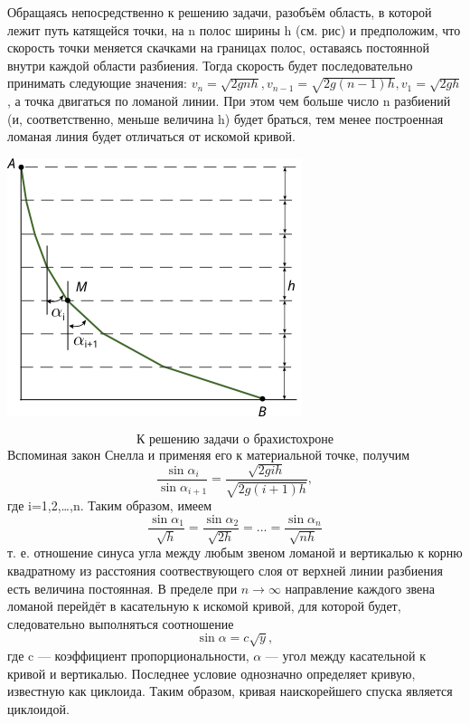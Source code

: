 \documentclass[a4paper, 12pt]{article}
\begin{document}
Обращаясь непосредственно к решению задачи, разобъём область, в которой лежит путь катящейся точки, на n полос ширины h (см. рис) и предположим, что скорость точки меняется скачками на границах полос, оставаясь постоянной внутри каждой области разбиения. Тогда скорость будет последовательно принимать следующие значения: $v_n = \sqrt{2gnh}, v_{n-1} = \sqrt{2g(n-1)h}, v_1 = \sqrt{2gh}$, а точка двигаться по ломаной линии. При этом чем больше число n разбиений (и, соответственно, меньше величина h) будет браться, тем менее построенная ломаная линия будет отличаться от искомой кривой. 
\begin{center}
\includegraphics[scale=1.5]{brahistohrona}
\end{center}
\[\textit{К решению задачи о брахистохроне}\]
Вспоминая закон Снелла и применяя его к материальной точке, получим 
\[\frac{\sin\alpha_i}{\sin\alpha_{i+1}} = \frac{\sqrt{2gih}}{\sqrt{2g(i+1)h}},\]
где i=1,2,…,n. Таким образом, имеем 
\[\frac{\sin\alpha_1}{\sqrt{h}} = \frac{\sin\alpha_2}{\sqrt{2h}} = ... = \frac{\sin\alpha_n}{\sqrt{nh}}\]
т. е. отношение синуса угла между любым звеном ломаной и вертикалью к корню квадратному из расстояния соотвествующего слоя от верхней линии разбиения есть величина постоянная. В пределе при $n \longrightarrow \infty$ направление каждого звена ломаной перейдёт в касательную к искомой кривой, для которой будет, следовательно выполняться соотношение
\begin{equation}
\sin\alpha = c\sqrt{y},
\end{equation}
где c — коэффициент пропорциональности, $\alpha$ — угол между касательной к кривой и вертикалью. Последнее условие однозначно определяет кривую, известную как циклоида. Таким образом, кривая наискорейшего спуска является циклоидой.
\end{document}
